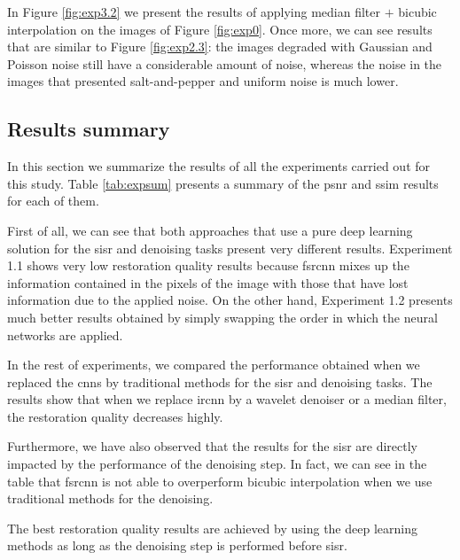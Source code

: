 In Figure \ref{fig:exp3.2} we present the results of applying median filter $+$ bicubic interpolation on the images of Figure \ref{fig:exp0}. Once more, we can see results that are similar to Figure \ref{fig:exp2.3}: the images degraded with Gaussian and Poisson noise still have a considerable amount of noise, whereas the noise in the images that presented salt-and-pepper and uniform noise is much lower.

\subsection{Results summary}
In this section we summarize the results of all the experiments carried out for this study. Table \ref{tab:expsum} presents a summary of the \gls{psnr} and \gls{ssim} results for each of them.

First of all, we can see that both approaches that use a pure deep learning solution for the \gls{sisr} and denoising tasks present very different results. Experiment 1.1 shows very low restoration quality results because \gls{fsrcnn} mixes up the information contained in the pixels of the image with those that have lost information due to the applied noise. On the other hand, Experiment 1.2 presents much better results obtained by simply swapping the order in which the neural networks are applied.

In the rest of experiments, we compared the performance obtained when we replaced the \glspl{cnn} by traditional methods for the \gls{sisr} and denoising tasks. The results show that when we replace \gls{ircnn} by a wavelet denoiser or a median filter, the restoration quality decreases highly.

Furthermore, we have also observed that the results for the \gls{sisr} are directly impacted by the performance of the denoising step. In fact, we can see in the table that \gls{fsrcnn} is not able to overperform bicubic interpolation when we use traditional methods for the denoising.

The best restoration quality results are achieved by using the deep learning methods as long as the denoising step is performed before \gls{sisr}.

